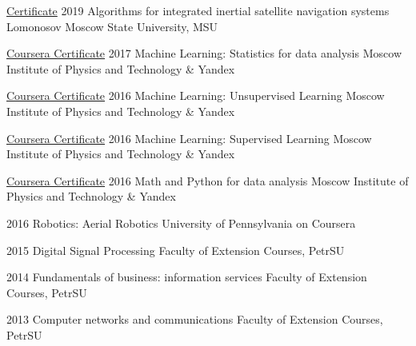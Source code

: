 \documentclass{tccv}
\begin{document}
\begin{yearlist}

\item[\href{https://www.dropbox.com/s/116ku7br2kqn5nr/doc00422820191224182244.pdf}{Certificate}]{2019}
     {Algorithms for integrated inertial satellite navigation systems}
     {Lomonosov Moscow State University, MSU}

\item[\href{https://www.coursera.org/account/accomplishments/records/PJCQYC92YUSU}{Coursera Certificate}]{2017}
     {Machine Learning: Statistics for data analysis}
     {Moscow Institute of Physics and Technology \& Yandex}

\item[\href{https://www.coursera.org/account/accomplishments/records/2MZW385H2Y2U}{Coursera Certificate}]{2016}
     {Machine Learning: Unsupervised Learning}
     {Moscow Institute of Physics and Technology \& Yandex}
     
\end{yearlist}
\begin{yearlist}

\item[\href{https://www.coursera.org/account/accomplishments/records/UFDJLATYB83T}{Coursera Certificate}]{2016}
     {Machine Learning: Supervised Learning}
     {Moscow Institute of Physics and Technology \& Yandex}

\item[\href{https://www.coursera.org/account/accomplishments/records/PJCQYC92YUSU}{Coursera Certificate}]{2016}
     {Math and Python for data analysis}
     {Moscow Institute of Physics and Technology \& Yandex}

\item[]{2016}
     {Robotics: Aerial Robotics}
     {University of Pennsylvania on Coursera}

\item[]{2015}
     {Digital Signal Processing}
     {Faculty of Extension Courses, PetrSU}

\item[]{2014}
     {Fundamentals of business: information services}
     {Faculty of Extension Courses, PetrSU}

\end{yearlist}
\begin{yearlist}

\item[]{2013}
     {Computer networks and communications}
     {Faculty of Extension Courses, PetrSU}

\end{yearlist}
\end{document}
